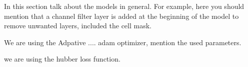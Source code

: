 
\glsresetall
\graphicspath{{./Sections/Methodology/Resources/}}

In this section talk about the models in general. For example, here you should mention that a channel filter layer is added at the beginning of the model to remove unwanted layers, included the cell mask.

We are using the Adpative .... adam optimizer, mention the used parameters.

we are using the hubber loss function.
